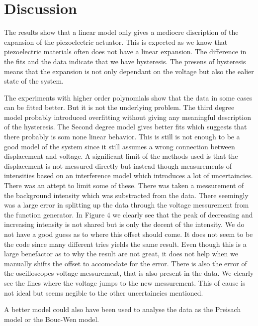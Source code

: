 \chapter{Discussion}
The results show that a linear model only gives a mediocre discription of the expansion of the piezoelectric actuator. 
This is expected as we know that piezoelectric materials often does not have a linear expansion. 
The difference in the fits and the data indicate that we have hysteresis. 
The presens of hysteresis means that the expansion is not only dependant on the voltage but also the ealier state of the system. 

The experiments with higher order polynomials show that the data in some cases can be fitted better.
But it is not the underlying problem. 
The third degree model probably introduced overfitting without giving any meaningful description of the hysteresis.
The Second degree model gives better fits which suggests that there probably is som none linear behavior.
This is still is not enough to be a good model of the system since it still assumes a wrong connection between displacement and voltage.
A significant limit of the methods used is that the displacement is not messured directly but instead though measurements of intensities based on an interference model which introduces a lot of uncertaincies.
There was an attept to limit some of these. There was taken a messurement of the background intensity which was substracted from the data. 
There seemingly was a large error in splitting up the data through the voltage messurement from the function generator. 
In Figure $4$ we clearly see that the peak of decreasing and increasing intensity is not shared but is only the decent of the intensity. 
We do not have a good guess as to where this offset should come. It does not seem to be the code since many different tries yields the same result.
Even though this is a large benefactor as to why the result are not great, it does not help when we manually shifts the offset to accomodate for the error. 
There is also the error of the oscilloscopes voltage messurement, that is also present in the data. We clearly see the lines where the voltage jumps to the new messurement. 
This of cause is not ideal but seems negible to the other uncertaincies mentioned.

A better model could also have been used to analyse the data as the Preisach model or the Bouc-Wen model. 